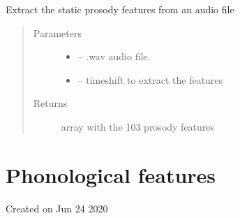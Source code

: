 \documentclass[letterpaper,10pt,english]{sphinxmanual}
\begin{document}
\begin{fulllineitems}
\begin{fulllineitems}
\end{fulllineitems}


\begin{fulllineitems}
\label{\detokenize{Prosody:prosody.Prosody.prosody_static}}
Extract the static prosody features from an audio file
\begin{quote}\begin{description}
\item[{Parameters}] \leavevmode\begin{itemize}
\item {} 
 -- .wav audio file.

\item {} 
 -- timeshift to extract the features

\end{itemize}

\item[{Returns}] \leavevmode
array with the 103 prosody features

\end{description}\end{quote}

\begin{sphinxVerbatim}[commandchars=\\\{\}]
 
\end{sphinxVerbatim}

\end{fulllineitems}


\end{fulllineitems}



\chapter{Phonological features}
\label{\detokenize{Phonological::doc}}\label{\detokenize{Phonological:module-phonological}}\label{\detokenize{Phonological:phonological-features}}
Created on Jun 24 2020
\end{document}
